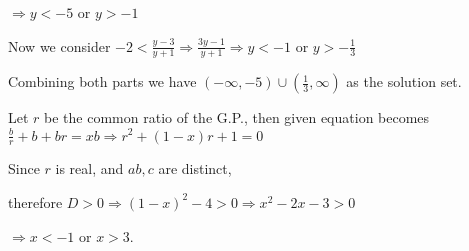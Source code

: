   $\Rightarrow y < -5$ or $y > -1$

  Now we consider $-2 < \frac{y - 3}{y + 1}\Rightarrow \frac{3y - 1}{y + 1}\Rightarrow y < -1$ or $y >
  -\frac{1}{3}$

  Combining both parts we have $(-\infty, -5)\cup \left(\frac{1}{3}, \infty\right)$ as the solution set.
\item Let $r$ be the common ratio of the G.P., then given equation becomes $\frac{b}{r} + b + br =
  xb \Rightarrow r^2 + (1 - x)r + 1 = 0$

  Since $r$ is real, and $a b, c$ are distinct,

  therefore $D> 0 \Rightarrow (1 - x)^2 - 4 > 0 \Rightarrow x^2 -2x - 3 > 0$

  $\Rightarrow x < -1$ or $x > 3$.
\stopitemize
